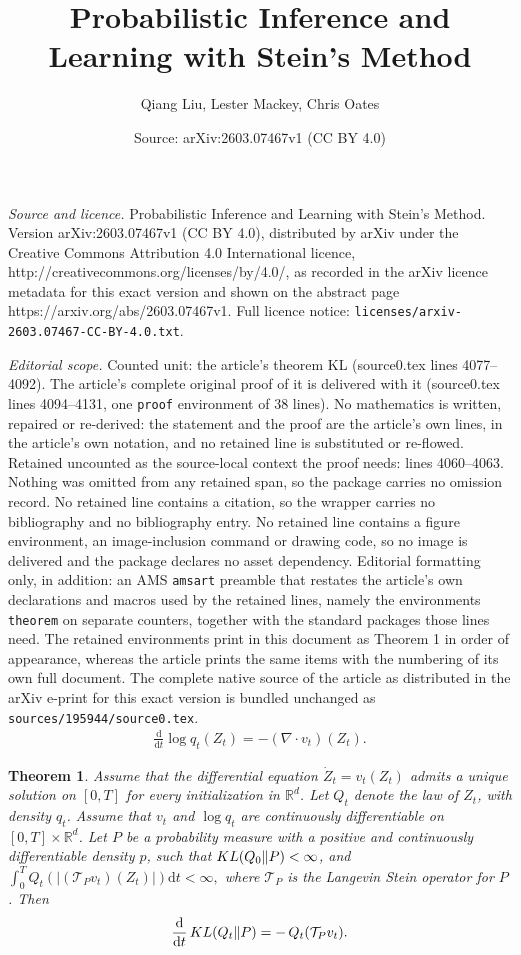 \documentclass[10pt,a4paper]{amsart}
\title{Probabilistic Inference and Learning with Stein's Method}
\author{Qiang Liu, Lester Mackey, Chris Oates}
\date{Source: arXiv:2603.07467v1 (CC BY 4.0)}
\newtheorem{theorem}{Theorem}
\def\KL#1#2{\textnormal{KL}({#1}\Vert{#2})}
\newcommand{\RR}{\mathbb{R}}
\newcommand{\df}{\mathrm{d}}
\begin{document}
\maketitle

\noindent\emph{Source and licence.} Probabilistic Inference and Learning with Stein's Method. Version arXiv:2603.07467v1 (CC BY 4.0), distributed by arXiv under the Creative Commons Attribution 4.0 International licence, http://creativecommons.org/licenses/by/4.0/, as recorded in the arXiv licence metadata for this exact version and shown on the abstract page https://arxiv.org/abs/2603.07467v1. Full licence notice: \texttt{licenses/arxiv-2603.07467-CC-BY-4.0.txt}.\par\smallskip

\noindent\textit{Editorial scope.} Counted unit: the article's theorem KL (source0.tex lines 4077--4092). The article's complete original proof of it is delivered with it (source0.tex lines 4094--4131, one \texttt{proof} environment of 38 lines). No mathematics is written, repaired or re-derived: the statement and the proof are the article's own lines, in the article's own notation, and no retained line is substituted or re-flowed.  Retained uncounted as the source-local context the proof needs: lines 4060--4063.  Nothing was omitted from any retained span, so the package carries no omission record.  No retained line contains a citation, so the wrapper carries no bibliography and no bibliography entry.  No retained line contains a figure environment, an image-inclusion command or drawing code, so no image is delivered and the package declares no asset dependency.  Editorial formatting only, in addition: an AMS \texttt{amsart} preamble that restates the article's own declarations and macros used by the retained lines, namely the environments \texttt{theorem} on separate counters, together with the standard packages those lines need.  The retained environments print in this document as Theorem 1 in order of appearance, whereas the article prints the same items with the numbering of its own full document.  The complete native source of the article as distributed in the arXiv e-print for this exact version is bundled unchanged as \texttt{sources/195944/source0.tex}.
\begin{align}
\label{equ:liouville}
\frac{\df}{\df t} \log q_t(Z_t) = - (\nabla \!\cdot v_t)(Z_t).
\end{align}

\begin{theorem}\label{thm: deriv KL}
Assume that the differential equation $\dot Z_t = v_t(Z_t)$ admits a unique solution on $[0,T]$ for every initialization in $\RR^d$.
Let $Q_t$ denote the law of $Z_t$, with density $q_t$.
Assume that $v_t$ and $\log q_t$ are continuously differentiable on $[0,T] \times \RR^d$.
Let $P$ be a probability measure with a positive and continuously differentiable density $p$, such that $\KL{Q_0}{P} < \infty$, and 
$\int_0^T Q_t(|(\mathcal{T}_P v_t)(Z_t)|)\df t < \infty,$ 
where $\mathcal{T}_P$ is the Langevin Stein operator for $P$.
Then
\begin{align}
\frac{\df}{\df t}\,
\KL{Q_t}{P}
=
-%
\,Q_t(\mathcal T_P v_t). 
\end{align} 
\end{theorem}
\end{document}
